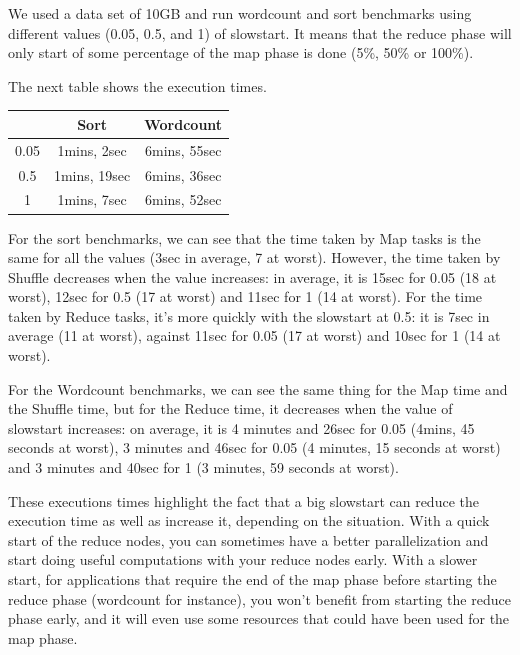 \documentclass{article}
\begin{document}
We used a data set of 10GB and run wordcount and sort benchmarks using
different values (0.05, 0.5, and 1) of slowstart.
It means that the reduce phase will only start of some percentage of the map phase is done (5\%, 50\% or 100\%).

The next table shows the execution times.

\begin{center}
\begin{tabular}{|c|c|c|}
\hline
\ & Sort & Wordcount \\
\hline
0.05 & 1mins, 2sec & 6mins, 55sec \\
\hline
0.5 & 1mins, 19sec & 6mins, 36sec \\
\hline
1 & 1mins, 7sec & 6mins, 52sec \\
\hline
\end{tabular}
\end{center}

For the sort benchmarks, we can see that the time taken by Map tasks is the same for all the values (3sec in average, 7 at worst).
However, the time taken by Shuffle decreases when the value increases: in average, it is 15sec for 0.05 (18 at worst), 12sec for 0.5 (17 at worst) and 11sec for 1 (14 at worst). For the time taken by Reduce tasks, it's more quickly with the slowstart at 0.5: it is 7sec in average (11 at worst), against 11sec for 0.05 (17 at worst) and 10sec for 1 (14 at worst).

For the Wordcount benchmarks, we can see the same thing for the Map time and the Shuffle time, but for the Reduce time, it decreases when the value of slowstart increases: on average, it is 4 minutes and 26sec for 0.05 (4mins, 45 seconds at worst), 3 minutes and 46sec for 0.05 (4 minutes, 15 seconds at worst) and 3 minutes and 40sec for 1 (3 minutes, 59 seconds at worst).


These executions times highlight the fact that a big slowstart can reduce the execution time as well as increase it, depending on the situation.
With a quick start of the reduce nodes, you can sometimes have a better parallelization and start doing useful computations with your reduce nodes early.
With a slower start, for applications that require the end of the map phase before starting the reduce phase (wordcount for instance), you won't benefit from starting the reduce phase early, and it will even use some resources that could have been used for the map phase.
\end{document}
